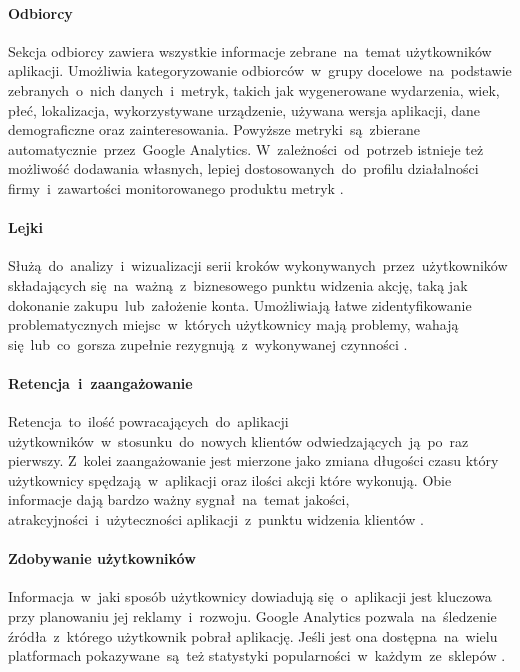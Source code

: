 \paragraph{Odbiorcy}
\label{par:ga-audiences}
Sekcja odbiorcy zawiera wszystkie informacje zebrane~na~temat użytkowników aplikacji. Umożliwia kategoryzowanie odbiorców~w~grupy docelowe~na~podstawie zebranych~o~nich danych~i~metryk, takich jak wygenerowane wydarzenia, wiek, płeć, lokalizacja, wykorzystywane urządzenie, używana wersja aplikacji, dane demograficzne oraz zainteresowania. Powyższe metryki~są~zbierane automatycznie~przez~Google Analytics. W~zależności~od~potrzeb istnieje też możliwość dodawania własnych, lepiej dostosowanych~do~profilu działalności firmy~i~zawartości monitorowanego produktu metryk \cite{GA_Audiences}.

\paragraph{Lejki}
\label{par:ga-funnels}
Służą~do~analizy~i~wizualizacji serii kroków wykonywanych~przez~użytkowników składających się~na~ważną~z~biznesowego punktu widzenia akcję, taką jak dokonanie zakupu~lub~założenie konta. Umożliwiają łatwe zidentyfikowanie problematycznych miejsc~w~których użytkownicy mają problemy, wahają się~lub~co~gorsza  zupełnie rezygnują~z~wykonywanej czynności \cite{GA_Funnels}.

\paragraph{Retencja~i~zaangażowanie} 
\label{par:ga-retention}
Retencja~to~ilość powracających~do~aplikacji  użytkowników~w~stosunku~do~nowych klientów odwiedzających~ją~po~raz pierwszy. Z~kolei zaangażowanie jest mierzone jako zmiana długości czasu który użytkownicy spędzają~w~aplikacji oraz ilości akcji które wykonują. Obie informacje dają bardzo ważny sygnał~na~temat jakości, atrakcyjności~i~użyteczności aplikacji~z~punktu widzenia klientów \cite{GA_Retention}.

\paragraph{Zdobywanie użytkowników}
Informacja~w~jaki sposób użytkownicy dowiadują się~o~aplikacji jest kluczowa przy planowaniu jej reklamy~i~rozwoju. Google Analytics pozwala~na~śledzenie źródła~z~którego użytkownik pobrał aplikację. Jeśli jest ona dostępna~na~wielu platformach pokazywane~są~też statystyki popularności~w~każdym~ze~sklepów \cite{GA_Aquisition}.
